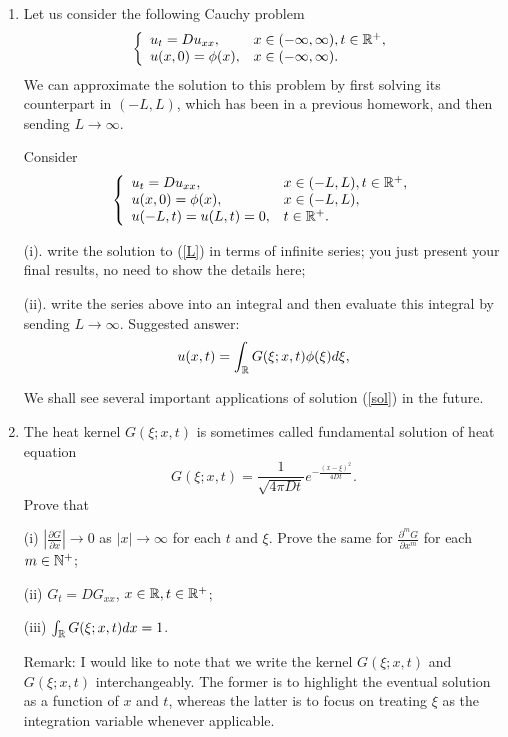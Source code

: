 \documentclass[6pt]{article}
\numberwithin{equation}{section}
\def\mathbb{\Bbb}
\begin{document}
\begin{enumerate}
\item  Let us consider the following Cauchy problem
\begin{equation}\label{infty}
\left\{
\begin{array}{ll}
u_t=D u_{xx},& x\in (-\infty,\infty), t\in\mathbb R^+,\\
u(x,0)=\phi(x),&x \in (-\infty,\infty).
\end{array}
\right.
\end{equation}
We can approximate the solution to this problem by first solving its counterpart in $(-L,L)$, which has been in a previous homework, and then sending $L\rightarrow\infty$.

Consider
\begin{equation}\label{L}
\left\{
\begin{array}{ll}
u_t=D u_{xx},& x\in (-L,L), t\in\mathbb R^+,\\
u(x,0)=\phi(x),&x \in (-L,L),\\
u(-L,t)=u(L,t)=0,& t\in\mathbb R^+.\\
\end{array}
\right.
\end{equation}

(i).  write the solution to (\ref{L}) in terms of infinite series; you just present your final results, no need to show the details here;

(ii).  write the series above into an integral and then evaluate this integral by sending $L\rightarrow \infty$.  Suggested answer:
\begin{equation}\label{sol}
u(x,t)=\int_{\mathbb R}G(\xi;x,t)\phi(\xi)d\xi,
\end{equation}

We shall see several important applications of solution (\ref{sol}) in the future.

\item   The heat kernel $G(\xi;x,t)$ is sometimes called fundamental solution of heat equation
\[G(\xi;x,t)=\frac{1}{\sqrt{4\pi Dt}}e^{-\frac{(x-\xi)^2}{4Dt}}.\]
Prove that

(i) $|\frac{\partial G}{\partial x}|\rightarrow 0$ as $|x|\rightarrow\infty$ for each $t$ and $\xi$.  Prove the same for $\frac{\partial^m G}{\partial x^m}$ for each $m\in \mathbb N^+$;

(ii) $G_t=DG_{xx}$, $x\in\mathbb R,t\in\mathbb R^+$;

(iii) $\int_{\mathbb R}G(\xi;x,t)dx=1$.

Remark:  I would like to note that we write the kernel $G(\xi;x,t)$ and $G(\xi;x,t)$ interchangeably.  The former is to highlight the eventual solution as a function of $x$ and $t$, whereas the latter is to focus on treating $\xi$ as the integration variable whenever applicable.


\end{enumerate}
\end{document}
